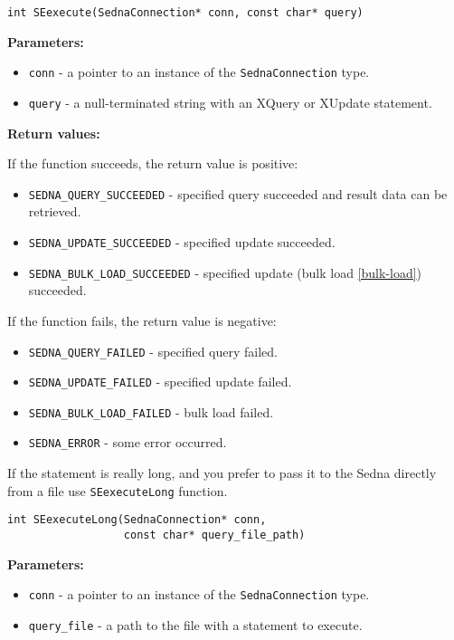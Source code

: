 \documentclass[a4paper,12pt]{article}
\newenvironment{citemize}
{\begin{itemize}
  \setlength{\itemsep}{0pt}
  \setlength{\parskip}{0pt}
  \setlength{\parsep}{0pt}}
{\end{itemize}}
\begin{document}
\begin{verbatim}
int SEexecute(SednaConnection* conn, const char* query)
\end{verbatim}

\noindent
\textbf{Parameters:}

\begin{citemize}
\item\verb!conn! - a pointer to an instance of the \verb!SednaConnection! type.
\item\verb!query! - a null-terminated string with an XQuery or XUpdate
statement.
\end{citemize}

\noindent
\textbf{Return values:}

\medskip

\noindent
If the function succeeds, the return value is positive:

\begin{citemize}
\item\verb!SEDNA_QUERY_SUCCEEDED! - specified query succeeded and result data
can be retrieved.
\item\verb!SEDNA_UPDATE_SUCCEEDED! - specified update succeeded.
\item\verb!SEDNA_BULK_LOAD_SUCCEEDED! - specified update (bulk load
\ref{bulk-load}) succeeded.
\end{citemize}

\noindent
If the function fails, the return value is negative:

\begin{citemize}
\item\verb!SEDNA_QUERY_FAILED! - specified query failed.
\item\verb!SEDNA_UPDATE_FAILED! - specified update failed.
\item\verb!SEDNA_BULK_LOAD_FAILED! - bulk load failed.
\item\verb!SEDNA_ERROR! - some error occurred.
\end{citemize}

If the statement is really long, and you prefer to pass it to the Sedna directly
from a file use \verb!SEexecuteLong! function.

\begin{verbatim}
int SEexecuteLong(SednaConnection* conn,
                  const char* query_file_path)
\end{verbatim}

\noindent
\textbf{Parameters:}

\begin{citemize}
\item\verb!conn! - a pointer to an instance of the \verb!SednaConnection! type.
\item\verb!query_file! - a path to the file with a statement to execute.
\end{citemize}
\end{document}
